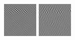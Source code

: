 \begin{figure}[ht]
\begin{center}
  \includegraphics[width=\columnwidth/9]{ch4/figures/real_-1_6.jpg}
  \includegraphics[width=\columnwidth/9]{ch4/figures/real_-1_7.jpg}\\

\end{center}
\end{figure}
